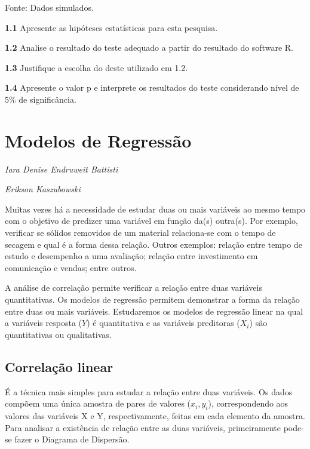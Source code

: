 \documentclass[12pt,brazil,oneside]{book}
\begin{document}
Fonte: Dados simulados.

\textbf{1.1} Apresente as hipóteses estatísticas para esta pesquisa.

\textbf{1.2} Analise o resultado do teste adequado a partir do resultado do software R.

\textbf{1.3} Justifique a escolha do deste utilizado em 1.2.

\textbf{1.4} Apresente o valor p e interprete os resultados do teste considerando nível de 5\% de significância.

\hypertarget{reg}{%
\chapter{Modelos de Regressão}\label{reg}}

\emph{Iara Denise Endruweit Battisti}

\emph{Erikson Kaszubowski}

\begin{flushright}
\emph{}
\end{flushright}

Muitas vezes há a necessidade de estudar duas ou mais variáveis ao mesmo tempo com o objetivo de predizer uma variável em função da(s) outra(s). Por exemplo, verificar se sólidos removidos de um material relaciona-se com o tempo de secagem e qual é a forma dessa relação. Outros exemplos: relação entre tempo de estudo e desempenho a uma avaliação; relação entre investimento em comunicação e vendas; entre outros.

A análise de correlação permite verificar a relação entre duas variáveis quantitativas. Os modelos de regressão permitem demonstrar a forma da relação entre duas ou mais variáveis. Estudaremos os modelos de regressão linear na qual a variáveis resposta (\(Y\)) é quantitativa e as variáveis preditoras (\(X_i\)) são quantitativas ou qualitativas.

\hypertarget{correlacao-linear}{%
\section{Correlação linear}\label{correlacao-linear}}

É a técnica mais simples para estudar a relação entre duas variáveis. Os dados compõem uma única amostra de pares de valores (\(x_i, y_i\)), correspondendo aos valores das variáveis X e Y, respectivamente, feitas em cada elemento da amostra. Para analisar a existência de relação entre as duas variáveis, primeiramente pode-se fazer o Diagrama de Dispersão.
\end{document}
